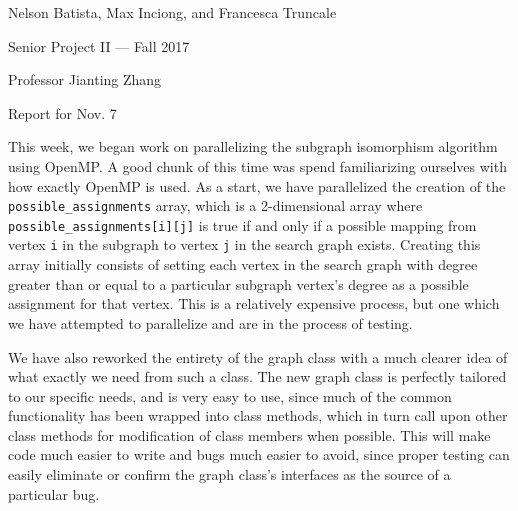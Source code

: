 \documentclass{article}
\begin{document}
\noindent Nelson Batista, Max Inciong, and Francesca Truncale

\noindent Senior Project II --- Fall 2017

\noindent Professor Jianting Zhang

\noindent Report for Nov. 7

This week, we began work on parallelizing the subgraph isomorphism algorithm using OpenMP. A good chunk of this time was spend familiarizing ourselves with how exactly OpenMP is used. As a start, we have parallelized the creation of the \texttt{possible\_assignments} array, which is a 2-dimensional array where \texttt{possible\_assignments[i][j]} is true if and only if a possible mapping from vertex \texttt{i} in the subgraph to vertex \texttt{j} in the search graph exists. Creating this array initially consists of setting each vertex in the search graph with degree greater than or equal to a particular subgraph vertex's degree as a possible assignment for that vertex. This is a relatively expensive process, but one which we have attempted to parallelize and are in the process of testing.

We have also reworked the entirety of the graph class with a much clearer idea of what exactly we need from such a class. The new graph class is perfectly tailored to our specific needs, and is very easy to use, since much of the common functionality has been wrapped into class methods, which in turn call upon other class methods for modification of class members when possible. This will make code much easier to write and bugs much easier to avoid, since proper testing can easily eliminate or confirm the graph class's interfaces as the source of a particular bug.
\end{document}
